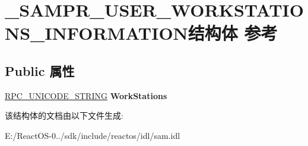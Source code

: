 \hypertarget{struct___s_a_m_p_r___u_s_e_r___w_o_r_k_s_t_a_t_i_o_n_s___i_n_f_o_r_m_a_t_i_o_n}{}\section{\+\_\+\+S\+A\+M\+P\+R\+\_\+\+U\+S\+E\+R\+\_\+\+W\+O\+R\+K\+S\+T\+A\+T\+I\+O\+N\+S\+\_\+\+I\+N\+F\+O\+R\+M\+A\+T\+I\+O\+N结构体 参考}
\label{struct___s_a_m_p_r___u_s_e_r___w_o_r_k_s_t_a_t_i_o_n_s___i_n_f_o_r_m_a_t_i_o_n}
\subsection*{Public 属性}
\begin{DoxyCompactItemize}
\item 
\mbox{\label{struct___s_a_m_p_r___u_s_e_r___w_o_r_k_s_t_a_t_i_o_n_s___i_n_f_o_r_m_a_t_i_o_n_abd186205f0cbd9b000315f975fd44cf8}} 
\hyperlink{struct___r_p_c___u_n_i_c_o_d_e___s_t_r_i_n_g}{R\+P\+C\+\_\+\+U\+N\+I\+C\+O\+D\+E\+\_\+\+S\+T\+R\+I\+NG} {\bfseries Work\+Stations}
\end{DoxyCompactItemize}


该结构体的文档由以下文件生成\+:\begin{DoxyCompactItemize}
\item 
E\+:/\+React\+O\+S-\/0../sdk/include/reactos/idl/sam.\+idl\end{DoxyCompactItemize}
